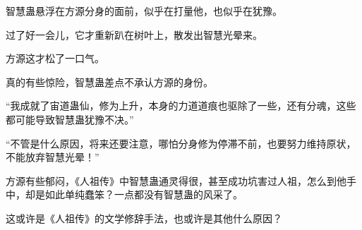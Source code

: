 \begin{this_body}
智慧蛊悬浮在方源分身的面前，似乎在打量他，也似乎在犹豫。

过了好一会儿，它才重新趴在树叶上，散发出智慧光晕来。

方源这才松了一口气。

真的有些惊险，智慧蛊差点不承认方源的身份。

“我成就了宙道蛊仙，修为上升，本身的力道道痕也驱除了一些，还有分魂，这些都可能导致智慧蛊犹豫不决。”

“不管是什么原因，将来还要注意，哪怕分身修为停滞不前，也要努力维持原状，不能放弃智慧光晕！”

方源有些郁闷，《人祖传》中智慧蛊通灵得很，甚至成功坑害过人祖，怎么到他手中，却是如此单纯蠢笨？一点都没有智慧蛊的风采了。

这或许是《人祖传》的文学修辞手法，也或许是其他什么原因？

\end{this_body}

